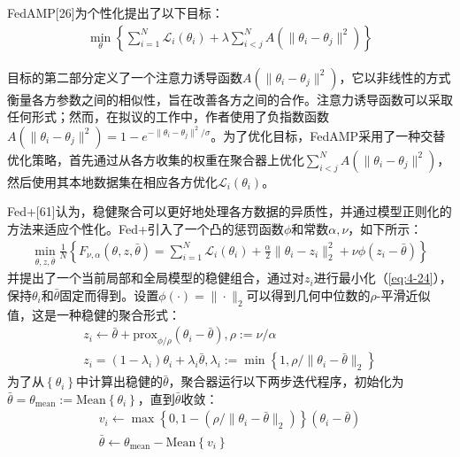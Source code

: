 FedAMP[26]为个性化提出了以下目标：
\begin{align}\label{eq:4-23}
	\min_{\theta} \left\{ \sum_{i=1}^{N} \mathcal{L}_{i}(\theta_{i}) + \lambda \sum_{i < j}^{N} A(\|\theta_{i} - \theta_{j}\|^{2}) \right\}
\end{align}

目标的第二部分定义了一个注意力诱导函数$A(\|\theta_{i} - \theta_{j}\|^{2})$，它以非线性的方式衡量各方参数之间的相似性，旨在改善各方之间的合作。注意力诱导函数可以采取任何形式；然而，在拟议的工作中，作者使用了负指数函数$A(\|\theta_{i} - \theta_{j}\|^{2}) = 1 - e^{-\|\theta_{i} - \theta_{j}\|^{2}/\sigma}$。为了优化目标，FedAMP采用了一种交替优化策略，首先通过从各方收集的权重在聚合器上优化$\sum_{i<j}^{N} A(\|\theta_{i} - \theta_{j}\|^{2})$，然后使用其本地数据集在相应各方优化$\mathcal{L}_{i}(\theta_{i})$。

Fed+[61]认为，稳健聚合可以更好地处理各方数据的异质性，并通过模型正则化的方法来适应个性化。Fed+引入了一个凸的惩罚函数$\phi$和常数$\alpha, \nu$，如下所示：
\begin{align}\label{eq:4-24}
	\min_{\theta, z, \bar{\theta}} \frac{1}{N} \left\{ F_{\nu, \alpha}(\theta, z, \bar{\theta}) = \sum_{i=1}^{N} \mathcal{L}_{i}(\theta_{i}) + \frac{\alpha}{2} \|\theta_{i} - z_{i}\|_{2}^{2} + \nu \phi (z_{i} - \bar{\theta}) \right\}
\end{align}
并提出了一个当前局部和全局模型的稳健组合，通过对$z_{i}$进行最小化（\ref{eq:4-24}），保持$\theta_{i}$和$\bar{\theta}$固定而得到。设置$\phi(\cdot) = \|\cdot\|_{2}$可以得到几何中位数的$\rho$-平滑近似值，这是一种稳健的聚合形式：
\begin{align*}
	z_{i} \leftarrow \bar{\theta} + \text{prox}_{\phi / \rho}(\theta_{i} - \bar{\theta}), \rho := \nu / \alpha \\
	z_{i} = (1 - \lambda_{i}) \theta_{i} + \lambda_{i}\bar{\theta}, \lambda_{i} := \min \left\{ 1, \rho / \|\theta_{i} - \bar{\theta}\|_{2} \right\}
\end{align*}
为了从$\left\{\theta_{i}\right\}$中计算出稳健的$\bar{\theta}$，聚合器运行以下两步迭代程序，初始化为$	\bar{\theta} = \theta_{\text{mean}} := \text{Mean}\left\{ \theta_{i} \right\}$，直到$\bar{\theta}$收敛：
\begin{align*}
	v_{i} \leftarrow \max \left\{ 0, 1 - (\rho / \|\theta_{i} - \bar{\theta}\|_{2}) \right\}(\theta_{i} - \bar{\theta}) \\
	\bar{\theta} \leftarrow \theta_{\text{mean}} - \text{Mean}\left\{ v_{i} \right\}
\end{align*}

